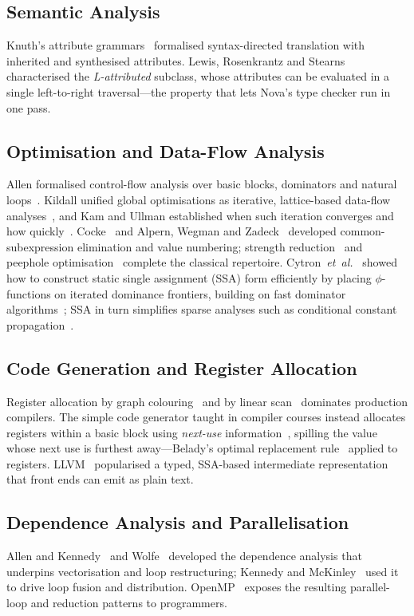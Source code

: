 \documentclass[conference]{IEEEtran}
\begin{document}
\subsection{Semantic Analysis}
Knuth's attribute grammars~\cite{knuth1968} formalised syntax-directed translation with inherited and synthesised attributes. Lewis, Rosenkrantz and Stearns~\cite{lewis1974} characterised the \emph{L-attributed} subclass, whose attributes can be evaluated in a single left-to-right traversal---the property that lets Nova's type checker run in one pass.

\subsection{Optimisation and Data-Flow Analysis}
Allen formalised control-flow analysis over basic blocks, dominators and natural loops~\cite{allen1970}. Kildall unified global optimisations as iterative, lattice-based data-flow analyses~\cite{kildall1973}, and Kam and Ullman established when such iteration converges and how quickly~\cite{kam1976,kam1977}. Cocke~\cite{cocke1970} and Alpern, Wegman and Zadeck~\cite{alpern1988} developed common-subexpression elimination and value numbering; strength reduction~\cite{allen1981} and peephole optimisation~\cite{mckeeman1965} complete the classical repertoire. Cytron~\emph{et~al.}~\cite{cytron1991} showed how to construct static single assignment (SSA) form efficiently by placing $\phi$-functions on iterated dominance frontiers, building on fast dominator algorithms~\cite{lengauer1979,cooper2001}; SSA in turn simplifies sparse analyses such as conditional constant propagation~\cite{wegman1991}.

\subsection{Code Generation and Register Allocation}
Register allocation by graph colouring~\cite{chaitin1982} and by linear scan~\cite{poletto1999} dominates production compilers. The simple code generator taught in compiler courses instead allocates registers within a basic block using \emph{next-use} information~\cite{aho2006}, spilling the value whose next use is furthest away---Belady's optimal replacement rule~\cite{belady1966} applied to registers. LLVM~\cite{lattner2004} popularised a typed, SSA-based intermediate representation that front ends can emit as plain text.

\subsection{Dependence Analysis and Parallelisation}
Allen and Kennedy~\cite{allen1987,allen2001} and Wolfe~\cite{wolfe1996} developed the dependence analysis that underpins vectorisation and loop restructuring; Kennedy and McKinley~\cite{kennedy1993} used it to drive loop fusion and distribution. OpenMP~\cite{openmp2021} exposes the resulting parallel-loop and reduction patterns to programmers.
\end{document}
